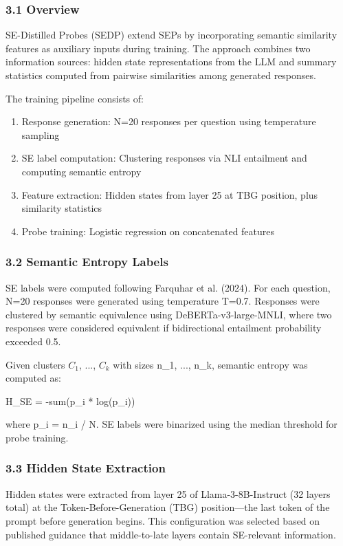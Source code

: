 
\subsubsection{3.1 Overview}

SE-Distilled Probes (SEDP) extend SEPs by incorporating semantic similarity features as auxiliary inputs during training. The approach combines two information sources: hidden state representations from the LLM and summary statistics computed from pairwise similarities among generated responses.

The training pipeline consists of:
\begin{enumerate}
\item Response generation: N=20 responses per question using temperature sampling
\item SE label computation: Clustering responses via NLI entailment and computing semantic entropy
\item Feature extraction: Hidden states from layer 25 at TBG position, plus similarity statistics
\item Probe training: Logistic regression on concatenated features
\end{enumerate}

\subsubsection{3.2 Semantic Entropy Labels}

SE labels were computed following Farquhar et al. (2024). For each question, N=20 responses were generated using temperature T=0.7. Responses were clustered by semantic equivalence using DeBERTa-v3-large-MNLI, where two responses were considered equivalent if bidirectional entailment probability exceeded 0.5.

Given clusters $C_1$, ..., $C_k$ with sizes n\_1, ..., n\_k, semantic entropy was computed as:

H\_SE = -sum(p\_i * log(p\_i))

where p\_i = n\_i / N. SE labels were binarized using the median threshold for probe training.

\subsubsection{3.3 Hidden State Extraction}

Hidden states were extracted from layer 25 of Llama-3-8B-Instruct (32 layers total) at the Token-Before-Generation (TBG) position---the last token of the prompt before generation begins. This configuration was selected based on published guidance that middle-to-late layers contain SE-relevant information.

